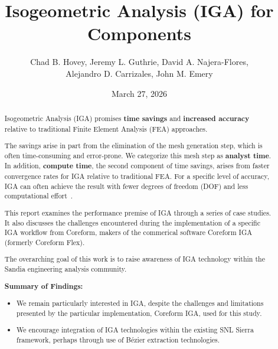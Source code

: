 \documentclass[12pt,report,justified]{SANDreport}
\title{Isogeometric Analysis (IGA) for Components}
\author{Chad B. Hovey, Jeremy L. Guthrie, David A. Najera-Flores, \\ Alejandro D. Carrizales, John M. Emery}
\date{March 27, 2026}
\begin{document}
    \maketitle

%
\begin{abstract}
Isogeometric Analysis (IGA) promises {\bf time savings} and {\bf increased accuracy} relative to traditional Finite Element Analysis (FEA) approaches.  

The savings arise in part from the elimination of the mesh generation step, which is often time-consuming and error-prone.  We categorize this mesh step as {\bf analyst time}.  In addition, {\bf compute time}, the second component of time savings, arises from faster convergence rates for IGA relative to traditional FEA.  For a specific level of accuracy, IGA can often achieve the result with fewer degrees of freedom (DOF) and less computational effort~\cite{Hughes2005Isogeometric, Hughes2022NCSU}.

This report examines the performance premise of IGA through a series of case studies.  
It also discusses the challenges encountered during the implementation of a specific IGA workflow from Coreform, makers of the commerical software Coreform IGA (formerly Coreform Flex).

The overarching goal of this work is to raise awareness of IGA technology within the Sandia engineering analysis community.

{\bf Summary of Findings:}
\begin{itemize}
\item We remain particularly interested in IGA, despite the challenges and limitations presented by the particular implementation, Coreform IGA, used for this study.
\item We encourage integration of IGA technologies within the existing SNL Sierra framework, perhaps through use of B{\'e}zier extraction technologies.
\end{itemize}

\end{abstract}

%
\tableofcontents
\listoffigures
\listoftables
\end{document}
